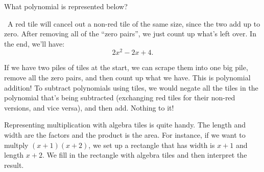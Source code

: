 \begin{boxedex}
What polynomial is represented below?

\begin{center}
\end{center}

\exsoln\ A red tile will cancel out a non-red tile of the same size, since the two add up to zero. After removing all of the ``zero pairs'', we just count up what's left over. In the end, we'll have:
\[2x^2 - 2x + 4.\]
\end{boxedex}

If we have two piles of tiles at the start, we can scrape them into one big pile, remove all the zero pairs, and then count up what we have. This is polynomial addition! To subtract polynomials using tiles, we would negate all the tiles in the polynomial that's being subtracted (exchanging red tiles for their non-red versions, and vice versa), and then add. Nothing to it!

Representing multiplication with algebra tiles is quite handy. The length and width are the factors and the product is the area. For instance, if we want to multply $(x+1)(x+2)$, we set up a rectangle that has width is $x+1$ and length $x+2$. We fill in the rectangle with algebra tiles and then interpret the result.

